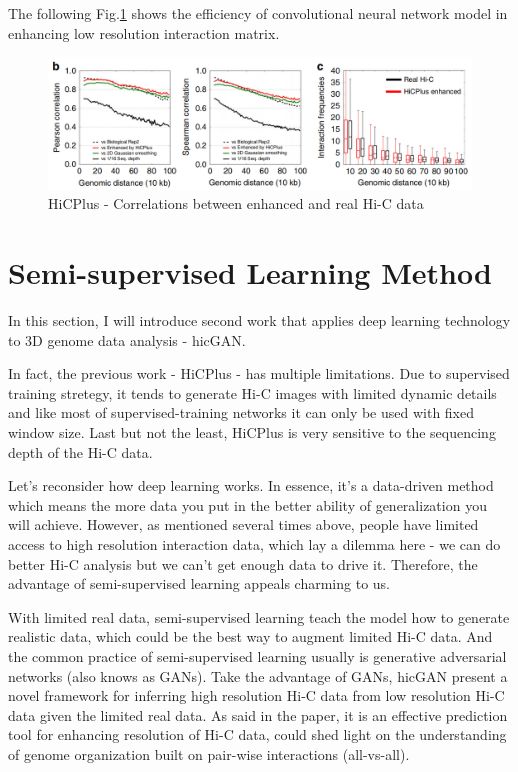 \documentclass{article}
\begin{document}
The following Fig.\ref{hicplusresult} shows the efficiency of convolutional neural network model in enhancing low resolution interaction matrix.
\begin{figure}[H]
    \centering
    \includegraphics[scale=0.25]{./docs/hicplus_result.png}
    \caption{HiCPlus - Correlations between enhanced and real Hi-C data}\label{hicplusresult}
\end{figure}


\section{Semi-supervised Learning Method}
In this section, I will introduce second work that applies deep learning technology to 3D genome data analysis - hicGAN\cite{hicgan}.

In fact, the previous work - HiCPlus - has multiple limitations. Due to supervised training stretegy, it tends to generate Hi-C images with limited dynamic details and like most of supervised-training networks it can only be used with fixed window size. Last but not the least, HiCPlus is very sensitive to the sequencing depth of the Hi-C data.

Let's reconsider how deep learning works. In essence, it's a data-driven method which means the more data you put in the better ability of generalization you will achieve. However, as mentioned several times above, people have limited access to high resolution interaction data, which lay a dilemma here - we can do better Hi-C analysis but we can't get enough data to drive it. Therefore, the advantage of semi-supervised learning appeals charming to us.

With limited real data, semi-supervised learning teach the model how to generate realistic data, which could be the best way to augment limited Hi-C data. And the common practice of semi-supervised learning usually is generative adversarial networks\cite{gan} (also knows as GANs). Take the advantage of GANs, hicGAN present a novel framework for inferring high resolution Hi-C data from low resolution Hi-C data given the limited real data. As said in the paper, it is an effective prediction tool for enhancing resolution of Hi-C data, could shed light on the understanding of genome organization built on pair-wise interactions (all-vs-all).
\end{document}
